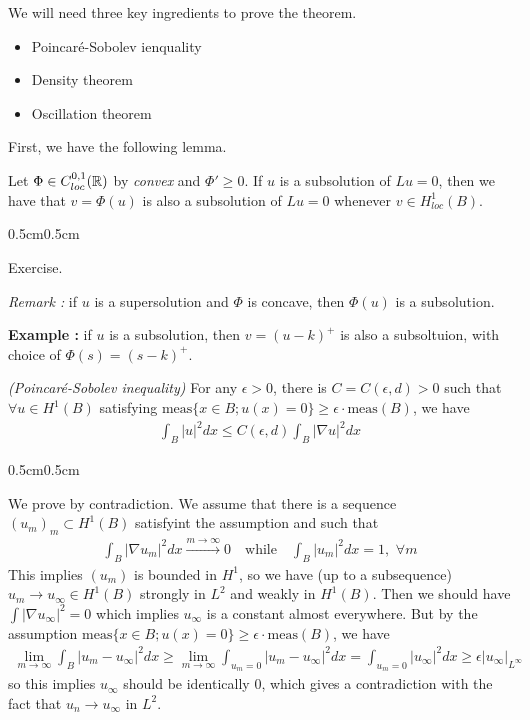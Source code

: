 \documentclass[12pt,a4paper]{article}
\newenvironment{proof}
{\begin{changemargin}{0.5cm}{0.5cm} 
	}%
	{\end{changemargin}
}
\newenvironment{p}
{\begin{proof} 
	}%
	{\end{proof}
}
\begin{document}
We will need three key ingredients to prove the theorem.
\begin{itemize}
\item Poincar\'{e}-Sobolev ienquality
\item Density theorem
\item Oscillation theorem
\end{itemize}
\s

First, we have the following lemma.
\s

\lem Let $\Phi \in C^{0,1}_{loc}(\mathbb{R})$ by \emph{convex} and $\Phi' \geq 0$. If $u$ is a subsolution of $Lu =0$, then we have that $v= \Phi(u)$ is also a subsolution of $Lu =0$ whenever $v\in H_{loc}^1(B)$.
\begin{p}
\pf Exercise.
\end{p}
\s

\emph{Remark :} if $u$ is a supersolution and $\Phi$ is concave, then $\Phi(u)$ is a subsolution.
\s

\textbf{Example :} if $u$ is a subsolution, then $v = (u-k)^+$ is also a subsoltuion, with choice of $\Phi(s) = (s-k)^+$.
\s

\prop \emph{(Poincar\'e-Sobolev inequality)} For any $\epsilon >0$, there is $C = C(\epsilon, d)>0$ such that $\forall u\in H^1(B)$ satisfying $\text{meas}\{x\in B ; u(x) =0 \}\geq \epsilon \cdot \text{meas}(B)$, we have
\begin{align*}
\int_B |u|^2 dx \leq C(\epsilon, d) \int_B |\nabla u|^2 dx 
\end{align*}
\begin{p}
\pf We prove by contradiction. We assume that there is a sequence $(u_m)_m \subset H^1(B)$ satisfyint the assumption and such that
\begin{align*}
\int_B |\nabla u_m|^2 dx \xrightarrow{m\rightarrow \infty} 0 \quad \text{while} \quad \int_B |u_m|^2 dx = 1, \,\,\forall m
\end{align*} 
This implies $(u_m)$ is bounded in $H^1$, so we have (up to a subsequence) $u_m \rightarrow u_{\infty} \in H^1(B)$ strongly in $L^2$ and weakly in $H^1(B)$. Then we should have $\int |\nabla u_{\infty}|^2 =0$ which implies $u_{\infty}$ is a constant almost everywhere. But by the assumption $\text{meas}\{x\in B ; u(x) =0 \}\geq \epsilon \cdot \text{meas}(B)$, we have
\begin{align*}
\lim_{m\rightarrow \infty} \int_{B} |u_m - u_{\infty}|^2 dx \geq \lim_{m\rightarrow \infty} \int_{u_m =0} |u_m - u_{\infty}|^2 dx  = \int_{u_m =0} |u_{\infty}|^2 dx  \geq \epsilon |u_{\infty}|_{L^{\infty}}
\end{align*}
so this implies $u_{\infty}$ should be identically 0, which gives a contradiction with the fact that $u_n \rightarrow u_{\infty}$ in $L^2$.

\eop
\end{p}
\s
\end{document}
